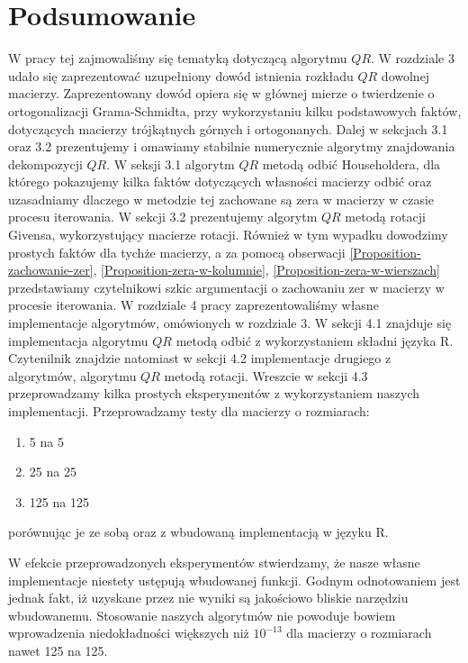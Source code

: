 \documentclass[12pt,a4paper]{report}
\newcommand{\mx}[1]{{#1}}
\begin{document}
\chapter{Podsumowanie}

W pracy tej zajmowaliśmy się tematyką dotyczącą algorytmu $\mx{QR}$. W rozdziale 3 udało się zaprezentować uzupełniony dowód istnienia rozkładu $\mx{QR}$ dowolnej macierzy. Zaprezentowany dowód opiera się w głównej mierze o twierdzenie o ortogonalizacji Grama-Schmidta, przy wykorzystaniu kilku podstawowych faktów, dotyczących macierzy trójkątnych górnych i ortogonanych. Dalej w sekcjach 3.1 oraz 3.2 prezentujemy i omawiamy stabilnie numerycznie algorytmy znajdowania dekompozycji $\mx{QR}$. W seksji 3.1 algorytm $\mx{QR}$ metodą odbić Householdera, dla którego pokazujemy kilka faktów dotyczących własności macierzy odbić oraz uzasadniamy dlaczego w metodzie tej zachowane są  zera w macierzy w czasie procesu iterowania. W sekcji 3.2 prezentujemy algorytm $\mx{QR}$ metodą rotacji Givensa, wykorzystujący macierze rotacji. Również w tym wypadku dowodzimy prostych faktów dla tychże macierzy, a za pomocą obserwacji \ref{Proposition-zachowanie-zer}, \ref{Proposition-zera-w-kolumnie}, \ref{Proposition-zera-w-wierszach}  przedstawiamy czytelnikowi szkic argumentacji o zachowaniu zer w macierzy w procesie iterowania. W rozdziale 4 pracy zaprezentowaliśmy własne implementacje algorytmów, omówionych w rozdziale 3. W sekcji 4.1 znajduje się implementacja algorytmu $\mx{QR}$ metodą odbić z wykorzystaniem składni języka R. Czytenilnik znajdzie natomiast w sekcji 4.2 implementacje drugiego z algorytmów, algorytmu $\mx{QR}$ metodą rotacji. Wreszcie w sekcji 4.3 przeprowadzamy kilka prostych eksperymentów z wykorzystaniem naszych implementacji. Przeprowadzamy testy dla macierzy o rozmiarach:
\begin{enumerate}
\item 5 na 5
\item 25 na 25
\item 125 na 125
\end{enumerate}
porównując je ze sobą oraz z wbudowaną implementacją w języku R.


W efekcie przeprowadzonych eksperymentów stwierdzamy, że nasze własne implementacje niestety ustępują wbudowanej funkcji. Godnym odnotowaniem jest jednak fakt, iż uzyskane przez nie wyniki są jakościowo bliskie narzędziu wbudowanemu. Stosowanie naszych algorytmów nie powoduje bowiem wprowadzenia niedokładności większych niż $10^{-13}$ dla macierzy o rozmiarach nawet 125 na 125.






\end{document}
